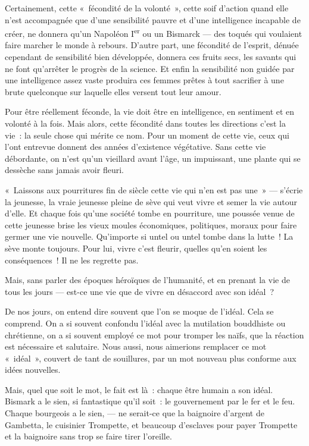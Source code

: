 \documentclass[french,twoside]{book} %
\begin{document}
\bigbreak
\noindent Certainement, cette « fécondité de la volonté », cette soif d’action quand elle n’est accompagnée que d’une sensibilité pauvre et d’une intelligence incapable de créer, ne donnera qu’un Napoléon I\textsuperscript{er} ou un Bismarck — des toqués qui voulaient faire marcher le monde à rebours. D’autre part, une fécondité de l’esprit, dénuée cependant de sensibilité bien développée, donnera ces fruits secs, les savants qui ne font qu’arrêter le progrès de la science. Et enfin la sensibilité non guidée par une intelligence assez vaste produira ces femmes prêtes à tout sacrifier à une brute quelconque sur laquelle elles versent tout leur amour.\par
Pour être réellement féconde, la vie doit être en intelligence, en sentiment et en volonté à la fois. Mais alors, cette fécondité dans toutes les directions c’est la vie : la seule chose qui mérite ce nom. Pour un moment de cette vie, ceux qui l’ont entrevue donnent des années d’existence végétative. Sans cette vie débordante, on n’est qu’un vieillard avant l’âge, un impuissant, une plante qui se dessèche sans jamais avoir fleuri.\par
« Laissons aux pourritures fin de siècle cette vie qui n’en est pas une » — s’écrie la jeunesse, la vraie jeunesse pleine de sève qui veut vivre et semer la vie autour d’elle. Et chaque fois qu’une société tombe en pourriture, une poussée venue de cette jeunesse brise les vieux moules économiques, politiques, moraux pour faire germer une vie nouvelle. Qu’importe si untel ou untel tombe dans la lutte ! La sève monte toujours. Pour lui, vivre c’est fleurir, quelles qu’en soient les conséquences ! Il ne les regrette pas.\par
\bigbreak
\noindent Mais, sans parler des époques héroïques de l’humanité, et en prenant la vie de tous les jours — est-ce une vie que de vivre en désaccord avec son idéal ?\par
De nos jours, on entend dire souvent que l’on se moque de l’idéal. Cela se comprend. On a si souvent confondu l’idéal avec la mutilation bouddhiste ou chrétienne, on a si souvent employé ce mot pour tromper les naïfs, que la réaction est nécessaire et salutaire. Nous aussi, nous aimerions remplacer ce mot « idéal », couvert de tant de souillures, par un mot nouveau plus conforme aux idées nouvelles.\par
Mais, quel que soit le mot, le fait est là : chaque être humain a son idéal. Bismark a le sien, si fantastique qu’il soit : le gouvernement par le fer et le feu. Chaque bourgeois a le sien, — ne serait-ce que la baignoire d’argent de Gambetta, le cuisinier Trompette, et beaucoup d’esclaves pour payer Trompette et la baignoire sans trop se faire tirer l’oreille.\par
\end{document}
